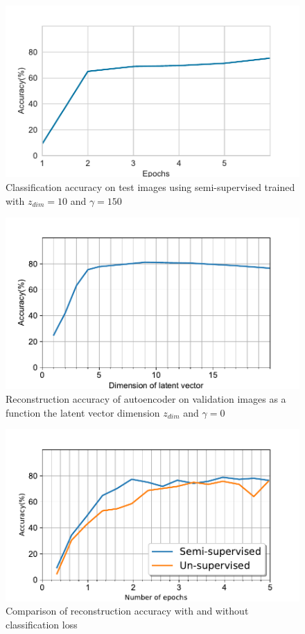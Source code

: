 \documentclass{uai2021} %
\begin{document}
\begin{figure}[]
\centering
\includegraphics[width=\linewidth]{classification_accuracy}
\caption{Classification accuracy on test images using semi-supervised trained with $z_{dim}=10$ and $\gamma = 150$}
\label{classification_accuracy}
\end{figure}

\begin{figure}[]
\centering
\includegraphics[width=\linewidth]{reconstruction_accuracy}
\caption{Reconstruction accuracy of autoencoder on validation images as a function the latent vector dimension  $z_{dim}$ and $\gamma = 0$}
\label{reconstruction_accuracy}
\end{figure}

\begin{figure}[!t]
\centering
\includegraphics[width=\linewidth]{reconstruction_accuracy_different_runs}
\caption{Comparison of reconstruction accuracy with and without classification loss }
\label{reconstruction_accuracy_sup_vs_unsup}
\end{figure}
\end{document}
